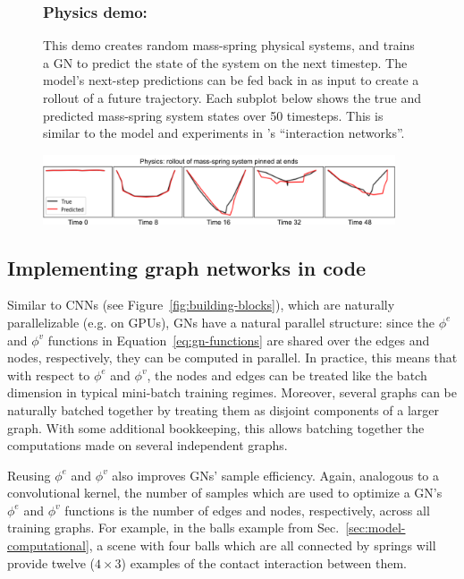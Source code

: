 \begin{figure}[t!]
\begin{infobox}
\subsubsection*{Physics demo: }
This demo creates random mass-spring physical systems, and trains a GN to predict the state of the system on the next timestep. The model's next-step predictions can be fed back in as input to create a rollout of a future trajectory. Each subplot below shows the true and predicted mass-spring system states over 50 timesteps. This is similar to the model and experiments in \citep{battaglia2016interaction}'s ``interaction networks''.
\begin{center} 
\includegraphics[trim={0 0.0cm 0 0.3cm},width=0.93\textwidth]{figures/demo_physics}
\end{center}

\label{box:gn-library}
\end{infobox}
\end{figure}

\subsection{Implementing graph networks in code}

Similar to CNNs (see Figure~\ref{fig:building-blocks}), which are naturally parallelizable (e.g. on GPUs), GNs have a natural parallel structure: since the $\phi^e$ and $\phi^v$ functions in Equation~\ref{eq:gn-functions} are shared over the edges and nodes, respectively, they can be computed in parallel. In practice, this means that with respect to $\phi^e$ and $\phi^v$, the nodes and edges can be treated like the batch dimension in typical mini-batch training regimes. Moreover, several graphs can be naturally batched together by treating them as disjoint components of a larger graph. With some additional bookkeeping, this allows batching together the computations made on several independent graphs.

Reusing $\phi^e$ and $\phi^v$ also improves GNs' sample efficiency. Again, analogous to a convolutional kernel, the number of samples which are used to optimize a GN's $\phi^e$ and $\phi^v$ functions is the number of edges and nodes, respectively, across all training graphs. For example, in the balls example from Sec.~\ref{sec:model-computational}, a scene with four balls which are all connected by springs will provide twelve ($4\times 3$) examples of the contact interaction between them.

